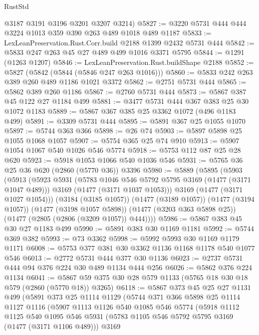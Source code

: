 \begin{lexlean}{RustStd}
\begin{coremodule}
      @3187
      @3191
      @3196
      @3201
      @3207
      @3214)
@5827 := @3220 @5731 @444 @444 @3224 @1013 @359 @390 @263 @489 @1018 @489 @1187
@5833 := LexLeanPreservation.Rust.Corr.build @2188 @1399 @2432 @5731 @444
@5842 := @5833 @247 @263 @45 @27 @489 @499 @1016 @3371 @5795
@5844 := @1291 (@1263 @1207)
@5846 := LexLeanPreservation.Rust.buildShape @2188
@5852 := @5827 (@5842 (@5844 (@5846 @247 @263 @1016)))
@5860 := @5833 @242 @263 @389 @260 @489 @1186 @1021 @3372
@5862 := @2751 @5731 @444
@5865 := @5862 @389 @260 @1186
@5867 := @2760 @5731 @444
@5873 := @5867 @387 @45 @122 @27 @1184 @499
@5881 := @3477 @5731 @444 @367 @383 @25 @30 @1072 @1183
@5889 := @5867 @367 @385 @25 @3362 @1072 (@496 @1183 @499)
@5891 := @3309 @5731 @444
@5895 := @5891 @367 @25 @1055 @1070
@5897 := @5744 @363 @366
@5898 := @26 @74
@5903 := @5897 @5898 @25 @1055 @1068 @1057
@5907 := @5754 @365 @25 @74 @910
@5913 := @5907 @1054 @1067 @540 @1026 @546 @5774
@5918 := @5753 @112 @87 @25 @28 @620
@5923 := @5918 @1053 @1066 @540 @1036 @546
@5931 := @5765 @36 @25 @36 @620 (@2860 (@5770 @36)) @3396
@5980 := @5889
    (@5895
      (@5903
        (@5913
          (@5923
            @5931
            (@5783 @1046 @546 @5792 @5795 @3169 (@1477 (@3171 @1047 @489)))
            @3169
            (@1477 (@3171 @1037 @1053)))
          @3169
          (@1477 (@3171 @1027 @1054)))
        (@3184 (@3185 @1057))
        (@1477 (@3189 @1057))
        (@1477 (@3194 @1057))
        (@1477 (@3198 @1057 @5898))
        (@1477 (@3203 @363 @5898 @25))
        (@1477 (@2805 (@2806 (@3209 @1057)) @444))))
@5986 := @5867 @383 @45 @30 @27 @1183 @499
@5990 := @5891 @383 @30 @1169 @1181
@5992 := @5744 @369 @382
@5993 := @73 @3362
@5998 := @5992 @5993 @30 @1169 @1179 @1171
@6008 := @5753 @377 @381 @30 @3362 @1136 @1168 @1178 @540 @1077 @546
@6013 := @2772 @5731 @444 @377 @30 @1136
@6023 := @2737 @5731 @444 @94 @376 @224 @30 @489 @1134 @444 @256
@6026 := @5862 @376 @224 @1134
@6041 := @5867 @59 @375 @30 @28 @579 @1133 (@5765 @18 @30 @18 @579 (@2860 (@5770 @18)) @3265)
@6118 := @5867
    @373
    @45
    @25
    @27
    @1131
    @499
    (@5891
      @373
      @25
      @1114
      @1129
      (@5744
        @371
        @366
        @5898
        @25
        @1114
        @1127
        @1116
        (@5907
          @1113
          @1126
          @540
          @1085
          @546
          @5774
          (@5918
            @1112
            @1125
            @540
            @1095
            @546
            @5931
            (@5783 @1105 @546 @5792 @5795 @3169 (@1477 (@3171 @1106 @489)))
            @3169

\end{coremodule}
\end{lexlean}
